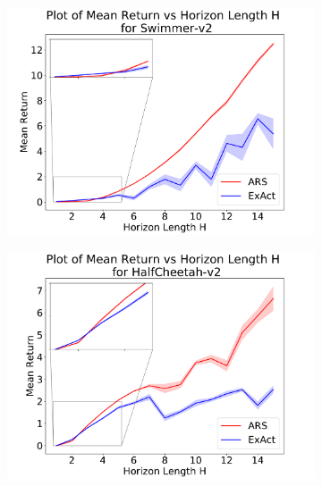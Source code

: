 \begin{figure}[t]
  \centering
  \begin{subfigure}{0.32\linewidth}
    \includegraphics[width=\linewidth]{figures/aistats19/plt_Swimmer-v2.pdf}\label{fig:swimmer}
  \end{subfigure}
  \begin{subfigure}{0.32\linewidth} \includegraphics[width=\linewidth]{figures/aistats19/plt_HalfCheetah-v2.pdf}\label{fig:halfcheetah}
  \end{subfigure}
  \begin{subfigure}{0.32\linewidth}

\end{subfigure}
\end{figure}
